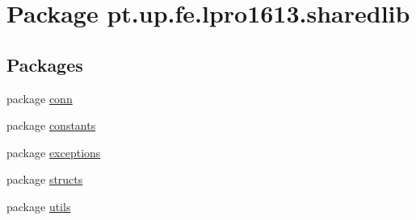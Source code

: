 \hypertarget{namespacept_1_1up_1_1fe_1_1lpro1613_1_1sharedlib}{}\section{Package pt.\+up.\+fe.\+lpro1613.\+sharedlib}
\label{namespacept_1_1up_1_1fe_1_1lpro1613_1_1sharedlib}
\subsection*{Packages}
\begin{DoxyCompactItemize}
\item 
package \hyperlink{namespacept_1_1up_1_1fe_1_1lpro1613_1_1sharedlib_1_1conn}{conn}
\item 
package \hyperlink{namespacept_1_1up_1_1fe_1_1lpro1613_1_1sharedlib_1_1constants}{constants}
\item 
package \hyperlink{namespacept_1_1up_1_1fe_1_1lpro1613_1_1sharedlib_1_1exceptions}{exceptions}
\item 
package \hyperlink{namespacept_1_1up_1_1fe_1_1lpro1613_1_1sharedlib_1_1structs}{structs}
\item 
package \hyperlink{namespacept_1_1up_1_1fe_1_1lpro1613_1_1sharedlib_1_1utils}{utils}
\end{DoxyCompactItemize}
